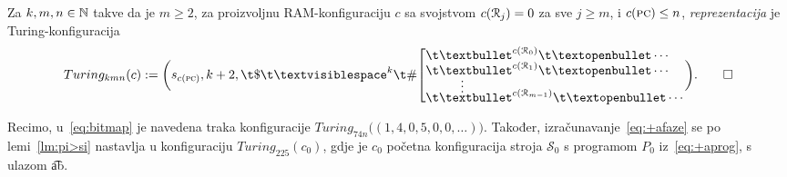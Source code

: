 \begin{definicija}[{name=[Turing-reprezentacija RAM-konfiguracije]}]
Za $k,m,n\in{\mathbb N}$ takve da je $m\ge 2$, za proizvoljnu RAM-konfiguraciju $c$ sa svojstvom $c(\mathcal R_{j})=0$ za sve $j\ge m$, i $c(\textsc{pc})\le n$, \emph{reprezentacija} je Turing-konfiguracija
\begin{equation}
Turing_{kmn}(c):=\biggl(s_{c(\textsc{pc})},k+2,\t\$\bl^k\t\#\!\left[\begin{array}{@{}l@{}}
\renewcommand{\arraystretch}{0.1}
\t\textbullet^{c(\reg0)}\t\textopenbullet\dotsm\\
\t\textbullet^{c(\reg1)}\t\textopenbullet\dotsm
\MTFlushSpaceBelow
\vdotswithin{\text\textbullet}
\MTFlushSpaceBelow
\t\textbullet^{c(\reg{m-1})}\t\textopenbullet\dotsm
\end{array}\right.\biggr)\text.\qedhere
\end{equation}
\end{definicija}

Recimo, u~\eqref{eq:bitmap} je navedena traka konfiguracije $Turing_{74n}\bigl((1,4,0,5,0,0,\dotsc)\bigr)$. Također, izračunavanje~\eqref{eq:+afaze} se po lemi~\ref{lm:pi>si} nastavlja u konfiguraciju $Turing_{225}(c_0)$, gdje je $c_0$ početna konfiguracija stroja $\mathcal S_0$ s programom $P_0$ iz~\eqref{eq:+aprog}, s ulazom \t{ab}.

